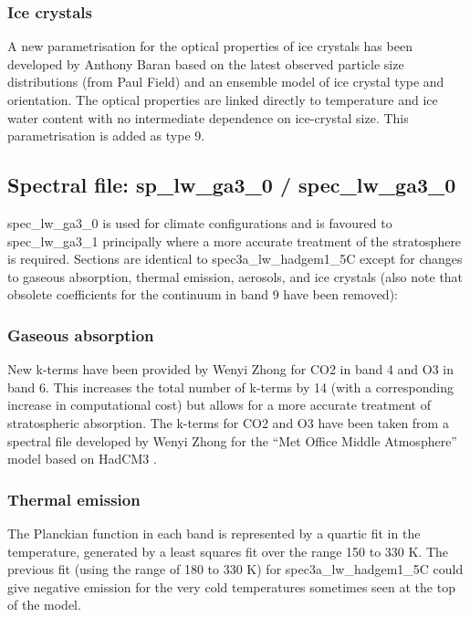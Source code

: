 \subsubsection*{Ice crystals}

A new parametrisation for the optical properties of ice crystals has been developed by Anthony Baran based on the latest observed particle size distributions (from Paul Field) and an ensemble model of ice crystal type and orientation. The optical properties are linked directly to temperature and ice water content with no intermediate dependence on ice-crystal size. This parametrisation is added as type 9.


\subsection*{Spectral file: sp\_lw\_ga3\_0 / spec\_lw\_ga3\_0}

spec\_lw\_ga3\_0 is used for climate configurations and is favoured to spec\_lw\_ga3\_1 principally where a more accurate treatment of the stratosphere is required. Sections are identical to spec3a\_lw\_hadgem1\_5C except for changes to gaseous absorption, thermal emission, aerosols, and ice crystals (also note that obsolete coefficients for the continuum in band 9 have been removed):


\subsubsection*{Gaseous absorption}

New k-terms have been provided by Wenyi Zhong for CO2 in band 4 and O3 in band 6. This increases the total number of k-terms by 14 (with a corresponding increase in computational cost) but allows for a more accurate treatment of stratospheric absorption. The k-terms for CO2 and O3 have been taken from a spectral file developed by Wenyi Zhong for the ``Met Office Middle Atmosphere'' model based on HadCM3 \citep{Zhong2000}.


\subsubsection*{Thermal emission}

The Planckian function in each band is represented by a quartic fit in the temperature, generated by a least squares fit over the range 150 to 330 K. The previous fit (using the range of 180 to 330 K) for spec3a\_lw\_hadgem1\_5C could give negative emission for the very cold temperatures sometimes seen at the top of the model. 


